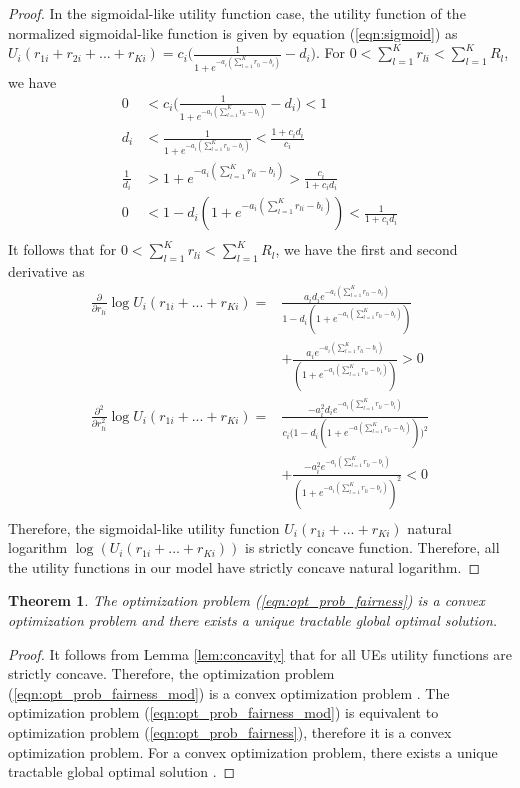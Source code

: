 \documentclass[journal]{IEEEtran} 		\usepackage{amsmath,amssymb}
\newtheorem{thm}{Theorem}[section]
\begin{document}
\begin{proof}
In the sigmoidal-like utility function case, the utility function of the normalized sigmoidal-like function is given by equation (\ref{eqn:sigmoid}) as $U_i(r_{1i} + r_{2i} + ... + r_{Ki}) = c_i\Big(\frac{1}{1+e^{-a_i(\sum_{l=1}^{K}r_{li}-b_i)}}-d_i\Big)$. For $0<\sum_{l=1}^{K}r_{li}<\sum_{l=1}^{K}R_l$, we have
\begin{equation*}\label{eqn:sigmoid_bound}
\begin{aligned}
0&<c_i\Big(\frac{1}{1+e^{-a_i(\sum_{l=1}^{K}r_{li}-b_i)}}-d_i\Big)<1\\
d_i&<\frac{1}{1+e^{-a_i(\sum_{l=1}^{K}r_{li}-b_i)}}<\frac{1+c_id_i}{c_i}\\
\frac{1}{d_i}&>{1+e^{-a_i(\sum_{l=1}^{K}r_{li}-b_i)}}>\frac{c_i}{1+c_id_i}\\
0&<1-d_i({1+e^{-a_i(\sum_{l=1}^{K}r_{li}-b_i)}})<\frac{1}{1+c_id_i}\\
\end{aligned}
\end{equation*}
It follows that for $0<\sum_{l=1}^{K}r_{li}<\sum_{l=1}^{K}R_l$, we have the first and second derivative as
\begin{equation*}\label{eqn:sigmoid_derivative}
\begin{aligned}
\frac{\partial}{ \partial r_{li}}\log U_i(r_{1i} + ... + r_{Ki}) =& \frac{a_i d_i e^{-a_i(\sum_{l=1}^{K}r_{li}-b_i)}}{1-d_i(1+e^{-a_i(\sum_{l=1}^{K}r_{li}-b_i)})} \\
\;\;\;&  + \frac{a_ie^{-a_i(\sum_{l=1}^{K}r_{li}-b_i)}}{(1+e^{-a_i(\sum_{l=1}^{K}r_{li}-b_i)})}>0\\
\frac{\partial^2}{\partial r_{li}^2}\log U_i(r_{1i} + ... + r_{Ki}) =& \frac{-a_i^2d_ie^{-a_i(\sum_{l=1}^{K}r_{li}-b_i)}}{c_i\Big(1-d_i(1+e^{-a(\sum_{l=1}^{K}r_{li}-b_i)})\Big)^2} \\
\;\;\;&  + \frac{-a_i^2e^{-a_i(\sum_{l=1}^{K}r_{li}-b_i)}}{(1+e^{-a_i(\sum_{l=1}^{K}r_{li}-b_i)})^2} < 0\\
\end{aligned}
\end{equation*}
Therefore, the sigmoidal-like utility function $U_i(r_{1i}+...+r_{Ki})$ natural logarithm  $\log(U_i(r_{1i}+...+r_{Ki}))$ is strictly concave function. Therefore, all the utility functions in our model have strictly concave natural logarithm.
\end{proof}
\begin{thm}\label{thm:global_soln}
The optimization problem (\ref{eqn:opt_prob_fairness}) is a convex optimization problem and there exists a unique tractable global optimal solution.
\end{thm}
\begin{proof}
It follows from Lemma \ref{lem:concavity} that for all UEs utility functions are strictly concave. Therefore, the optimization problem (\ref{eqn:opt_prob_fairness_mod}) is a convex optimization problem \cite{Boyd2004}. The optimization problem (\ref{eqn:opt_prob_fairness_mod}) is equivalent to optimization problem (\ref{eqn:opt_prob_fairness}), therefore it is a convex optimization problem. For a convex optimization problem, there exists a unique tractable global optimal solution \cite{Boyd2004}.
\end{proof}
\end{document}
